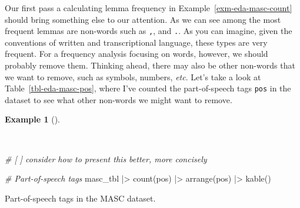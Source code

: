 \documentclass[
  letterpaper,
  DIV=11,
  numbers=noendperiod]{scrreport}
\newenvironment{Shaded}{\begin{snugshade}}{\end{snugshade}}
\newcommand{\CommentTok}[1]{\textcolor[rgb]{0.00,0.00,0.00}{\textit{#1}}}
\newcommand{\FunctionTok}[1]{\textcolor[rgb]{0.00,0.00,0.00}{#1}}
\newcommand{\NormalTok}[1]{\textcolor[rgb]{0.00,0.00,0.00}{#1}}
\newcommand{\SpecialCharTok}[1]{\textcolor[rgb]{0.00,0.00,0.00}{#1}}
\theoremstyle{definition}
\newtheorem{example}{Example}[chapter]
\theoremstyle{remark}
\begin{document}
Our first pass a calculating lemma frequency in
Example~\ref{exm-eda-masc-count} should bring something else to our
attention. As we can see among the most frequent lemmas are non-words
such as \texttt{,}, and \texttt{.}. As you can imagine, given the
conventions of written and transcriptional language, these types are
very frequent. For a frequency analysis focusing on words, however, we
should probably remove them. Thinking ahead, there may also be other
non-words that we want to remove, such as symbols, numbers, \emph{etc}.
Let's take a look at Table~\ref{tbl-eda-masc-pos}, where I've counted
the part-of-speech tags \texttt{pos} in the dataset to see what other
non-words we might want to remove.

\begin{example}[]\protect\hypertarget{exm-eda-masc-pos}{}\label{exm-eda-masc-pos}

~

\begin{Shaded}
\begin{Highlighting}[]
\CommentTok{\# [ ] consider how to present this better, more concisely}

\CommentTok{\# Part{-}of{-}speech tags}
\NormalTok{masc\_tbl }\SpecialCharTok{|\textgreater{}} 
  \FunctionTok{count}\NormalTok{(pos) }\SpecialCharTok{|\textgreater{}} 
  \FunctionTok{arrange}\NormalTok{(pos) }\SpecialCharTok{|\textgreater{}} 
  \FunctionTok{kable}\NormalTok{()}
\end{Highlighting}
\end{Shaded}

\hypertarget{tbl-eda-masc-pos}{}
\begin{table}
\caption{\label{tbl-eda-masc-pos}Part-of-speech tags in the MASC dataset. }\tabularnewline


\end{table}
\end{example}
\end{document}
